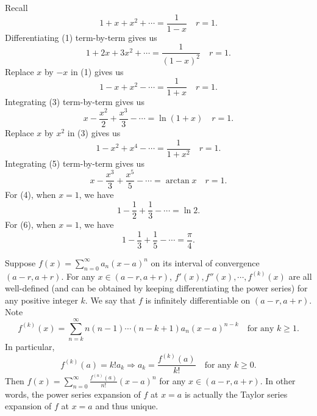 \documentclass[a4paper]{ctexart}
\begin{document}
    \begin{myex}
        Recall
        \begin{equation}
            1+x+x^2 + \cdots = \frac{1}{1-x} \quad r=1. \tag{1}
        \end{equation}
        Differentiating (1) term-by-term gives us
        \begin{equation}
            1 + 2x + 3x^2 + \cdots = \frac{1}{(1-x)^2} \quad r=1. \tag{2}
        \end{equation}
        Replace $x$ by $-x$ in (1) gives us
        \begin{equation}
            1-x+x^2 - \cdots = \frac{1}{1+x} \quad r=1. \tag{3}
        \end{equation}
        Integrating (3) term-by-term gives us
        \begin{equation}
            x - \frac{x^2}{2} + \frac{x^3}{3} - \cdots = \ln(1+x) \quad r=1. \tag{4}
        \end{equation}
        Replace $x$ by $x^2$ in (3) gives us
        \begin{equation}
            1-x^2+x^4 - \cdots = \frac{1}{1+x^2} \quad r=1. \tag{5}
        \end{equation}
        Integrating (5) term-by-term gives us
        \begin{equation}
            x - \frac{x^3}{3} + \frac{x^5}{5} - \cdots = \arctan x \quad r=1. \tag{6}
        \end{equation}
        For (4), when $x=1$, we have
        \[
            1 - \frac{1}{2} + \frac{1}{3} - \cdots = \ln 2.
        \]
        For (6), when $x=1$, we have
        \[
            1 - \frac{1}{3} + \frac{1}{5} - \cdots = \frac{\pi}{4}.
        \]
    \end{myex}
    \begin{myrmk}
        Suppose $f(x) = \displaystyle \sum_{n=0}^\infty a_n (x-a)^n$ on its interval of convergence $(a-r,a+r)$. For any $x\in (a-r,a+r)$, $f'(x), f''(x), \cdots, f^{(k)}(x)$ are all well-defined (and can be obtained by keeping differentiating the power series) for any positive integer $k$. We say that $f$ is infinitely differentiable on $(a-r,a+r)$. Note
        $$ f^{(k)}(x) = \sum_{n=k}^\infty n(n-1)\cdots (n-k+1) a_n (x-a)^{n-k} \quad \text{for any } k\ge 1. $$
        In particular,
        $$ f^{(k)}(a) = k! a_k \Rightarrow a_k = \frac{f^{(k)}(a)}{k!} \quad \text{for any } k\ge 0. $$
        Then $f(x) = \displaystyle \sum_{n=0}^\infty \frac{f^{(n)}(a)}{n!} (x-a)^n$ for any $x\in (a-r,a+r)$. In other words, the power series expansion of $f$ at $x=a$ is actually the Taylor series expansion of $f$ at $x=a$ and thus unique.
    \end{myrmk}
\end{document}
